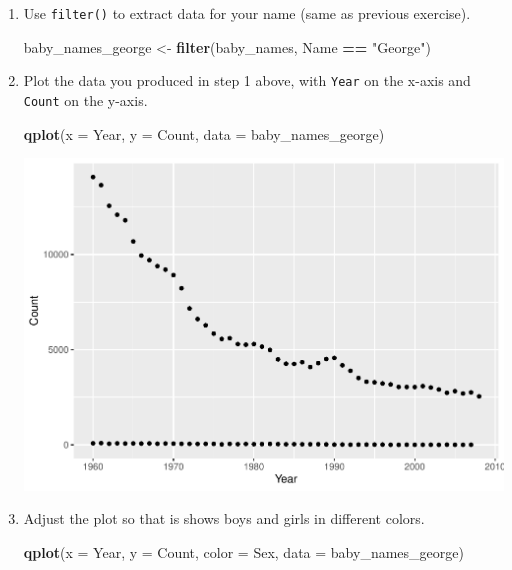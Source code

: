 \documentclass[]{book}
\newenvironment{Shaded}{\begin{snugshade}}{\end{snugshade}}
\newcommand{\DataTypeTok}[1]{\textcolor[rgb]{0.13,0.29,0.53}{#1}}
\newcommand{\KeywordTok}[1]{\textcolor[rgb]{0.13,0.29,0.53}{\textbf{#1}}}
\newcommand{\NormalTok}[1]{#1}
\newcommand{\OperatorTok}[1]{\textcolor[rgb]{0.81,0.36,0.00}{\textbf{#1}}}
\newcommand{\StringTok}[1]{\textcolor[rgb]{0.31,0.60,0.02}{#1}}
\begin{document}
\begin{enumerate}
\def\labelenumi{\arabic{enumi}.}
\item
  Use \texttt{filter()} to extract data for your name (same as previous exercise).

\begin{Shaded}
\begin{Highlighting}[]
\NormalTok{baby_names_george <-}\StringTok{ }\KeywordTok{filter}\NormalTok{(baby_names, Name }\OperatorTok{==}\StringTok{ "George"}\NormalTok{)}
\end{Highlighting}
\end{Shaded}
\item
  Plot the data you produced in step 1 above, with \texttt{Year} on the x-axis and \texttt{Count} on the y-axis.

\begin{Shaded}
\begin{Highlighting}[]
\KeywordTok{qplot}\NormalTok{(}\DataTypeTok{x =}\NormalTok{ Year, }\DataTypeTok{y =}\NormalTok{ Count, }\DataTypeTok{data =}\NormalTok{ baby_names_george)}
\end{Highlighting}
\end{Shaded}

  \includegraphics{R/Rintro/figures/unnamed-chunk-49-1.pdf}
\item
  Adjust the plot so that is shows boys and girls in different colors.

\begin{Shaded}
\begin{Highlighting}[]
\KeywordTok{qplot}\NormalTok{(}\DataTypeTok{x =}\NormalTok{ Year, }\DataTypeTok{y =}\NormalTok{ Count, }\DataTypeTok{color =}\NormalTok{ Sex, }\DataTypeTok{data =}\NormalTok{ baby_names_george)}
\end{Highlighting}
\end{Shaded}


\end{enumerate}
\end{document}
